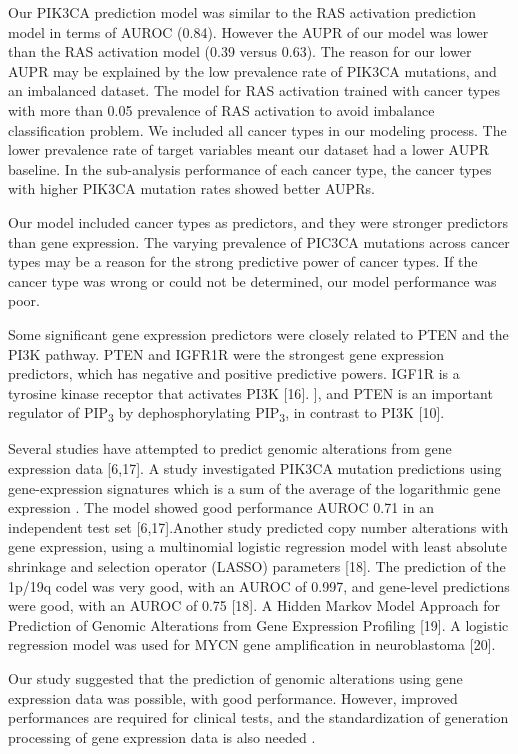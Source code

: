 \documentclass[10pt,letterpaper]{article}
\begin{document}
Our PIK3CA prediction model was similar to the RAS activation prediction
model in terms of AUROC (0.84). However the AUPR of our model was lower
than the RAS activation model (0.39 versus 0.63). The reason for our
lower AUPR may be explained by the low prevalence rate of PIK3CA
mutations, and an imbalanced dataset. The model for RAS activation
trained with cancer types with more than 0.05 prevalence of RAS
activation to avoid imbalance classification problem. We included all
cancer types in our modeling process. The lower prevalence rate of
target variables meant our dataset had a lower AUPR baseline. In the
sub-analysis performance of each cancer type, the cancer types with
higher PIK3CA mutation rates showed better AUPRs.

Our model included cancer types as predictors, and they were stronger
predictors than gene expression. The varying prevalence of PIC3CA
mutations across cancer types may be a reason for the strong predictive
power of cancer types. If the cancer type was wrong or could not be
determined, our model performance was poor.

Some significant gene expression predictors were closely related to PTEN
and the PI3K pathway. PTEN and IGFR1R were the strongest gene expression
predictors, which has negative and positive predictive powers. IGF1R is
a tyrosine kinase receptor that activates PI3K {[}16{]}. {]}, and PTEN
is an important regulator of PIP\textsubscript{3} by dephosphorylating
PIP\textsubscript{3}, in contrast to PI3K {[}10{]}.

Several studies have attempted to predict genomic alterations from gene
expression data {[}6,17{]}. A study investigated PIK3CA mutation
predictions using gene-expression signatures which is a sum of the
average of the logarithmic gene expression . The model showed good
performance AUROC 0.71 in an independent test set {[}6,17{]}.Another
study predicted copy number alterations with gene expression, using a
multinomial logistic regression model with least absolute shrinkage and
selection operator (LASSO) parameters {[}18{]}. The prediction of the
1p/19q codel was very good, with an AUROC of 0.997, and gene-level
predictions were good, with an AUROC of 0.75 {[}18{]}. A Hidden Markov
Model Approach for Prediction of Genomic Alterations from Gene
Expression Profiling {[}19{]}. A logistic regression model was used for
MYCN gene amplification in neuroblastoma {[}20{]}.

Our study suggested that the prediction of genomic alterations using
gene expression data was possible, with good performance. However,
improved performances are required for clinical tests, and the
standardization of generation processing of gene expression data is also
needed .
\end{document}
